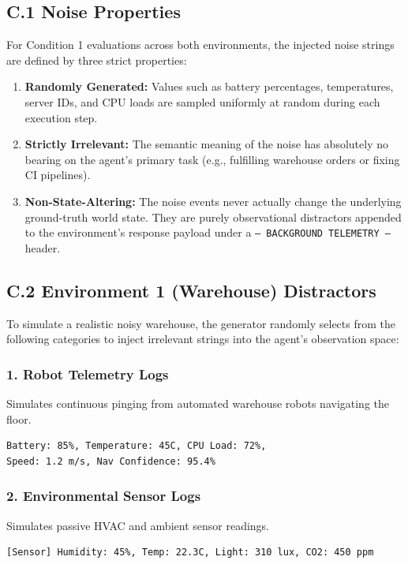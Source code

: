 \documentclass[11pt]{article}
\begin{document}
\subsection*{C.1 Noise Properties}
For Condition 1 evaluations across both environments, the injected noise strings are defined by three strict properties:
\begin{enumerate}
    \item \textbf{Randomly Generated:} Values such as battery percentages, temperatures, server IDs, and CPU loads are sampled uniformly at random during each execution step.
    \item \textbf{Strictly Irrelevant:} The semantic meaning of the noise has absolutely no bearing on the agent's primary task (e.g., fulfilling warehouse orders or fixing CI pipelines).
    \item \textbf{Non-State-Altering:} The noise events never actually change the underlying ground-truth world state. They are purely observational distractors appended to the environment's response payload under a \texttt{--- BACKGROUND TELEMETRY ---} header.
\end{enumerate}

\subsection*{C.2 Environment 1 (Warehouse) Distractors}

To simulate a realistic noisy warehouse, the generator randomly selects from the following categories to inject irrelevant strings into the agent's observation space:

\subsubsection*{1. Robot Telemetry Logs}
Simulates continuous pinging from automated warehouse robots navigating the floor.
\begin{lstlisting}
Battery: 85%, Temperature: 45C, CPU Load: 72%,
Speed: 1.2 m/s, Nav Confidence: 95.4%
\end{lstlisting}

\subsubsection*{2. Environmental Sensor Logs}
Simulates passive HVAC and ambient sensor readings.
\begin{lstlisting}
[Sensor] Humidity: 45%, Temp: 22.3C, Light: 310 lux, CO2: 450 ppm
\end{lstlisting}
\end{document}
